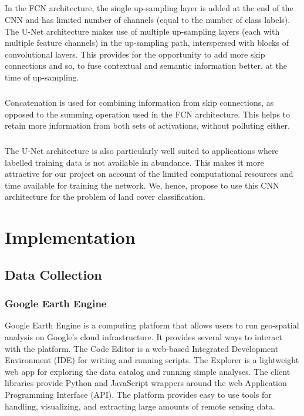 \documentclass[12pt, a4paper]{report}
\begin{document}
\paragraph{}
In the FCN architecture, the single up-sampling layer is added at the end of the CNN and has limited number of channels (equal to the number of class labels). The U-Net architecture makes use of multiple up-sampling layers (each with multiple feature channels) in the up-sampling path, interspersed with blocks of convolutional layers. This provides for the opportunity to add more skip connections and so, to fuse contextual and semantic information better, at the time of up-sampling. 
\paragraph{}
Concatenation is used for combining information from skip connections, as opposed to the summing operation used in the FCN architecture. This helps to retain more information from both sets of activations, without polluting either.
\paragraph{}
The U-Net architecture is also particularly well suited to applications where labelled training data is not available in abundance. This makes it more attractive for our project on account of the limited computational resources and time available for training the network. We, hence, propose to use this CNN architecture for the problem of land cover classification.
\chapter{Implementation}
\section{Data Collection}
\subsection{Google Earth Engine}
Google Earth Engine is a computing platform that allows users to run geo-spatial analysis on Google's cloud infrastructure. It provides several ways to interact with the platform. The Code Editor is a web-based Integrated Development Environment (IDE) for writing and running scripts. The Explorer is a lightweight web app for exploring the data catalog and running simple analyses. The client libraries provide Python and JavaScript wrappers around the web Application Programming Interface (API). The platform provides easy to use tools for handling, visualizing, and extracting large amounts of remote sensing data.\cite{gee1}
\end{document}
